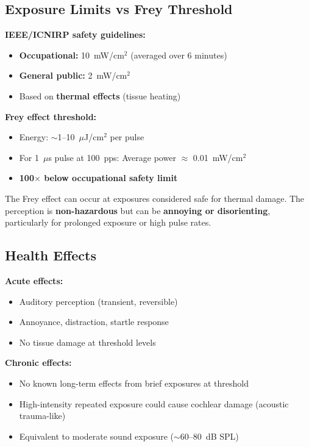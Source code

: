 \subsection{Exposure Limits vs Frey Threshold}

\textbf{IEEE/ICNIRP safety guidelines:}
\begin{itemize}
\item \textbf{Occupational:} 10~mW/cm$^2$ (averaged over 6 minutes)
\item \textbf{General public:} 2~mW/cm$^2$
\item Based on \textbf{thermal effects} (tissue heating)
\end{itemize}

\textbf{Frey effect threshold:}
\begin{itemize}
\item Energy: $\sim$1--10~$\mu$J/cm$^2$ per pulse
\item For 1~$\mu$s pulse at 100~pps: Average power $\approx$ 0.01~mW/cm$^2$
\item \textbf{100$\times$ below occupational safety limit}
\end{itemize}

\begin{importantbox}
The Frey effect can occur at exposures considered safe for thermal damage. The perception is \textbf{non-hazardous} but can be \textbf{annoying or disorienting}, particularly for prolonged exposure or high pulse rates.
\end{importantbox}

\subsection{Health Effects}

\textbf{Acute effects:}
\begin{itemize}
\item Auditory perception (transient, reversible)
\item Annoyance, distraction, startle response
\item No tissue damage at threshold levels
\end{itemize}

\textbf{Chronic effects:}
\begin{itemize}
\item No known long-term effects from brief exposures at threshold
\item High-intensity repeated exposure could cause cochlear damage (acoustic trauma-like)
\item Equivalent to moderate sound exposure ($\sim$60--80~dB SPL)
\end{itemize}

